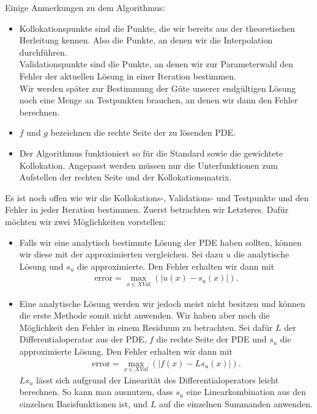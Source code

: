 Einige Anmerkungen zu dem Algorithmus:
\begin{itemize}
\item
Kollokationspunkte sind die Punkte, die wir bereits aus der theoretischen Herleitung kennen. Also die Punkte, an denen wir die Interpolation durchführen.\\
Validationspunkte sind die Punkte, an denen wir zur Parameterwahl den Fehler der aktuellen Lösung in einer Iteration bestimmen.\\
Wir werden später zur Bestimmung der Güte unserer endgültigen Lösung noch eine Menge an Testpunkten brauchen, an denen wir dann den Fehler berechnen.
\item
$f$ und $g$ bezeichnen die rechte Seite der zu lösenden \gls{PDE}.
\item
Der Algorithmus funktioniert so für die Standard sowie die gewichtete Kollokation. Angepasst werden müssen nur die Unterfunktionen zum Aufstellen der rechten Seite und der Kollokationsmatrix.
\end{itemize}
Es ist noch offen wie wir die Kollokations-, Validations- und Testpunkte und den Fehler in jeder Iteration bestimmen. Zuerst betrachten wir Letzteres. Dafür möchten wir zwei Möglichkeiten vorstellen:
\begin{itemize}
\item
Falls wir eine analytisch bestimmte Lösung der \gls{PDE} haben sollten, können wir diese mit der approximierten vergleichen. Sei dazu $u$ die analytische Lösung und $s_u$ die approximierte. Den Fehler erhalten wir dann mit
\begin{align*}
\mathrm{error} = \max_{x \in XVal} \left(\left| u(x) - s_u(x) \right| \right).
\end{align*}
\item
Eine analytische Lösung werden wir jedoch meist nicht besitzen und können die erste Methode somit nicht anwenden. Wir haben aber noch die Möglichkeit den Fehler in einem Residuum zu betrachten. Sei dafür $L$ der Differentialoperator aus der \gls{PDE}, $f$ die rechte Seite der \gls{PDE} und $s_u$ die approximierte Lösung. Den Fehler erhalten wir dann mit
\begin{align*}
\mathrm{error} = \max_{x \in XVal} \left(\left| f(x) - L s_u(x) \right| \right).
\end{align*}
$Ls_u$ lässt sich aufgrund der Linearität des Differentialoperators leicht berechnen. So kann man ausnutzen, dass $s_u$ eine Linearkombination aus den einzelnen Basisfunktionen ist, und $L$ auf die einzelnen Summanden anwenden.
\end{itemize}

